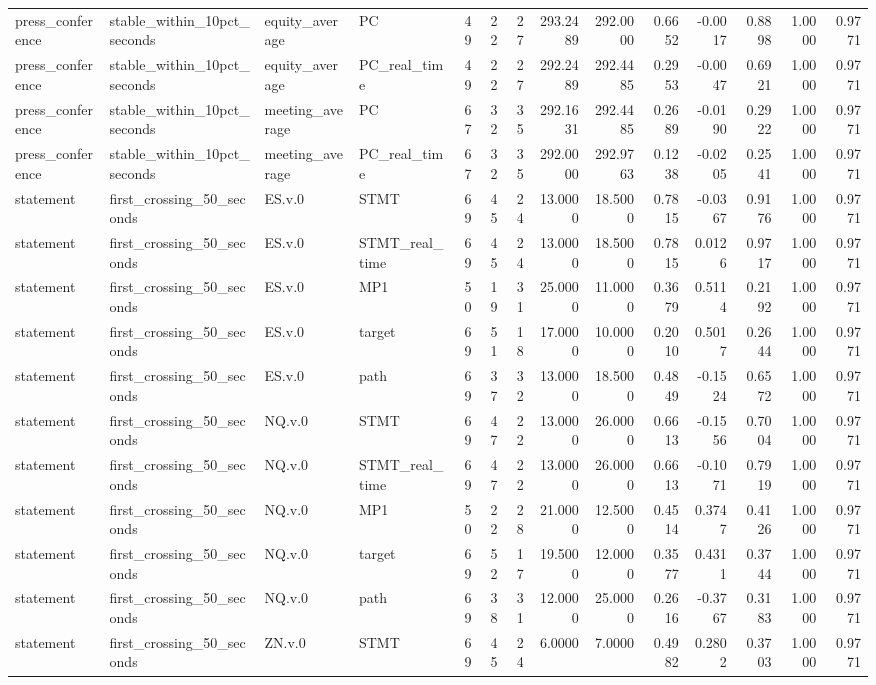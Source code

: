 \begin{tabular}{llllrrrrrrrrrr}
press_conference & stable_within_10pct_seconds & equity_average & PC & 49 & 22 & 27 & 293.2489 & 292.0000 & 0.6652 & -0.0017 & 0.8898 & 1.0000 & 0.9771 \\
press_conference & stable_within_10pct_seconds & equity_average & PC_real_time & 49 & 22 & 27 & 292.2489 & 292.4485 & 0.2953 & -0.0047 & 0.6921 & 1.0000 & 0.9771 \\
press_conference & stable_within_10pct_seconds & meeting_average & PC & 67 & 32 & 35 & 292.1631 & 292.4485 & 0.2689 & -0.0190 & 0.2922 & 1.0000 & 0.9771 \\
press_conference & stable_within_10pct_seconds & meeting_average & PC_real_time & 67 & 32 & 35 & 292.0000 & 292.9763 & 0.1238 & -0.0205 & 0.2541 & 1.0000 & 0.9771 \\
statement & first_crossing_50_seconds & ES.v.0 & STMT & 69 & 45 & 24 & 13.0000 & 18.5000 & 0.7815 & -0.0367 & 0.9176 & 1.0000 & 0.9771 \\
statement & first_crossing_50_seconds & ES.v.0 & STMT_real_time & 69 & 45 & 24 & 13.0000 & 18.5000 & 0.7815 & 0.0126 & 0.9717 & 1.0000 & 0.9771 \\
statement & first_crossing_50_seconds & ES.v.0 & MP1 & 50 & 19 & 31 & 25.0000 & 11.0000 & 0.3679 & 0.5114 & 0.2192 & 1.0000 & 0.9771 \\
statement & first_crossing_50_seconds & ES.v.0 & target & 69 & 51 & 18 & 17.0000 & 10.0000 & 0.2010 & 0.5017 & 0.2644 & 1.0000 & 0.9771 \\
statement & first_crossing_50_seconds & ES.v.0 & path & 69 & 37 & 32 & 13.0000 & 18.5000 & 0.4849 & -0.1524 & 0.6572 & 1.0000 & 0.9771 \\
statement & first_crossing_50_seconds & NQ.v.0 & STMT & 69 & 47 & 22 & 13.0000 & 26.0000 & 0.6613 & -0.1556 & 0.7004 & 1.0000 & 0.9771 \\
statement & first_crossing_50_seconds & NQ.v.0 & STMT_real_time & 69 & 47 & 22 & 13.0000 & 26.0000 & 0.6613 & -0.1071 & 0.7919 & 1.0000 & 0.9771 \\
statement & first_crossing_50_seconds & NQ.v.0 & MP1 & 50 & 22 & 28 & 21.0000 & 12.5000 & 0.4514 & 0.3747 & 0.4126 & 1.0000 & 0.9771 \\
statement & first_crossing_50_seconds & NQ.v.0 & target & 69 & 52 & 17 & 19.5000 & 12.0000 & 0.3577 & 0.4311 & 0.3744 & 1.0000 & 0.9771 \\
statement & first_crossing_50_seconds & NQ.v.0 & path & 69 & 38 & 31 & 12.0000 & 25.0000 & 0.2616 & -0.3767 & 0.3183 & 1.0000 & 0.9771 \\
statement & first_crossing_50_seconds & ZN.v.0 & STMT & 69 & 45 & 24 & 6.0000 & 7.0000 & 0.4982 & 0.2802 & 0.3703 & 1.0000 & 0.9771 \\

\end{tabular}
